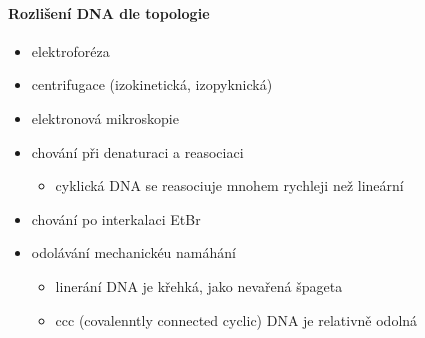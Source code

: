 \documentclass[DIV=8]{scrreprt}
\begin{document}
\paragraph{Rozlišení DNA dle topologie}
\begin{itemize}[nosep]
    \item elektroforéza
    \item centrifugace (izokinetická, izopyknická)
    \item elektronová mikroskopie
    \item chování při denaturaci a reasociaci
\begin{itemize}[nosep]
    \item cyklická DNA se reasociuje mnohem rychleji než lineární
\end{itemize}

    \item chování po interkalaci EtBr
    \item odolávání mechanickéu namáhání
\begin{itemize}[nosep]
    \item linerání DNA je křehká, jako nevařená špageta
    \item ccc (covalenntly connected cyclic) DNA je relativně odolná
\end{itemize}

\end{itemize}
\end{document}
